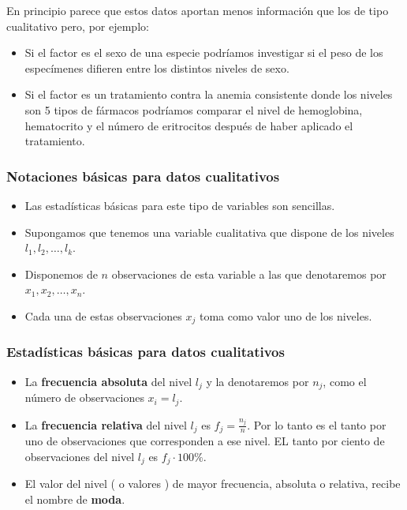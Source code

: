 \begin{frame}
 En principio  parece que estos datos aportan menos información que los de tipo cualitativo pero, por ejemplo:
\begin{itemize}
\item Si el factor es el sexo  de una especie podríamos investigar si el peso de los especímenes difieren entre los distintos niveles de sexo.
\item Si el factor es un tratamiento contra la anemia consistente  donde los niveles son 5 tipos de fármacos podríamos comparar  el nivel de hemoglobina, hematocrito  y el número de eritrocitos después de haber aplicado el tratamiento.
\end{itemize}
\end{frame}


\begin{frame}
\frametitle{Notaciones básicas para datos cualitativos}
\begin{itemize}
\item  Las estadísticas básicas para este tipo de variables son sencillas.
\item  Supongamos que tenemos una variable cualitativa que dispone de los niveles $l_1,l_2,\ldots,l_k$.
\item  Disponemos de $n$ observaciones de esta variable a las que denotaremos por $x_1,x_2,\ldots,x_n$.
\item  Cada una de estas observaciones $x_j$ toma como valor uno de los niveles.
\end{itemize}
\end{frame}

\begin{frame}
\frametitle{Estadísticas básicas para datos cualitativos}
\begin{itemize}
\item La \textbf{frecuencia absoluta} del nivel $l_j$ y la denotaremos por $n_j$, como el número de observaciones $x_i=l_j$.
\item La \textbf{frecuencia relativa} del nivel $l_j$ es  $f_j=\frac{n_j}{n}$. Por lo tanto es el tanto por uno de observaciones que corresponden a ese nivel. EL tanto por ciento de observaciones del nivel $l_j$ es $f_j\cdot 100\%$.
\item El valor del nivel ( o valores ) de mayor frecuencia, absoluta o relativa, recibe el nombre de \textbf{moda}.
\end{itemize}
\end{frame}

